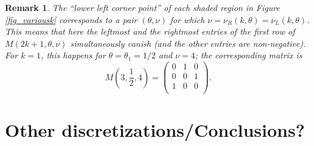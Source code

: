 \documentclass[a4paper]{article}
\newtheorem{remark}{Remark}
\newcommand{\te}{\theta}
\newcommand{\nul}{\nu_L(k,\theta)}
\newcommand{\nur}{\nu_R(k,\theta)}
\begin{document}
\begin{remark}
The ``lower left corner point'' of each shaded region in Figure \ref{fig_variousk} corresponds to a pair 
$(\te,\nu)$  for which $\nu=\nur=\nul$. This means that here the leftmost and the rightmost entries of the first row of $M(2k+1,\te,\nu)$ simultaneously vanish (and the other entries are non-negative). For $k=1$, this happens for $\te=\te_1=1/2$ and $\nu=4$; the corresponding matrix is
\begin{equation}\label{rem10thetahalfmatrix}
M\left(3,\frac{1}{2},4\right)=\left(
\begin{array}{ccc}
 0 & 1 & 0 \\
 0 & 0 & 1 \\
 1 & 0 & 0 \\
\end{array}
\right).
\end{equation}
\end{remark}






\section{Other discretizations/Conclusions?}\label{SNIEP}

\end{document}
